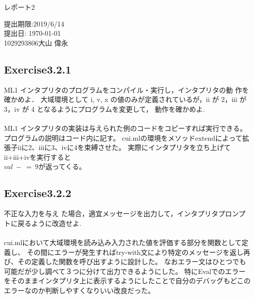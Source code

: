 \documentclass[a4paper,11pt,oneside,openany]{jsarticle}
\begin{document}
    \begin{center}

      \vspace*{35mm}
      \huge レポート2 \par
      \vspace{90mm}
      \Large 提出期限:2019/6/14\\
       提出日: \today \\
      \vspace{15mm}
      \Large
       1029293806\hspace{5mm}大山 偉永\par

      \vspace{10mm}
    \end{center}
    \clearpage
    \addtocounter{page}{-1}

    \newpage

\subsection{Exercise3.2.1}
    ML1 インタプリタのプログラムをコンパイル・実行し，インタプリタの動 作を確かめよ．
    大域環境として i, v, x の値のみが定義されているが，ii が 2，iii が 3，iv が 4 となるようにプログラムを変更して，
    動作を確かめよ.\\\\
    ML1 インタプリタの実装は与えられた例のコードをコピーすれば実行できる。プログラムの説明はコード内に記す。
    cui.mlの環境をメソッドextendによって拡張子iiに2、iiiに3、ivに4を束縛させた。
    実際にインタプリタを立ち上げてii+iii+ivを実行すると\\
    $val\ -\ =\ 9$が返ってくる。

\subsection{Exercise3.2.2}
    不正な入力を与え た場合，適宜メッセージを出力して，インタプリタプロンプトに戻るように改造せよ.\\\\
    cui.mlにおいて大域環境を読み込み入力された値を評価する部分を関数として定義し、
    その間にエラーが発生すればtry-with文により特定のメッセージを返し再び、その定義した関数を呼び出すように設計した。
    なおエラー文はひとつでも可能だが少し調べて３つに分けて出力できるようにした。
    特にEvalでのエラーをそのままインタプリタ上に表示するようにしたことで自分のデバッグもどこのエラーなのか判断しやすくなりいい改良だった。
\end{document}
